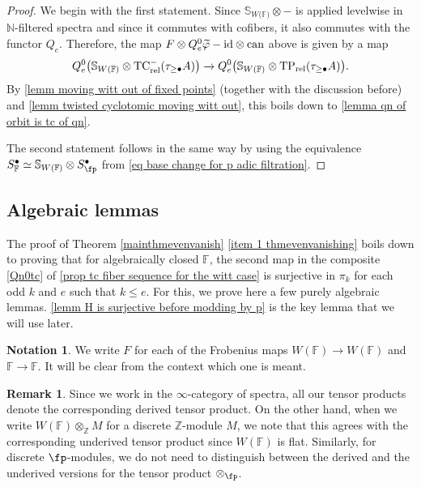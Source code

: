 \documentclass[english,10pt]{amsart}
\newcommand{\sphwf}{\mathbb{S}_{W(\mathbb{F)}}}
\newcommand{\rel}{\textup{rel}}
\newcommand{\field}{\mathbb{F}}
\theoremstyle{definition}
\newtheorem{nota}{Notation}[section]
\newtheorem{rema}{Remark}[section]
\numberwithin{equation}{section}
\newcommand{\rntc}{\mathrm{TC}_{\rel}^{-}}
\newcommand{\rtp}{\mathrm{TP}_{\rel}}
\newcommand{\z}{\mathbb{Z}}
\newcommand{\N}{\mathbb{N}}
\newcommand{\wtw}{\tau_{\geq \bullet}}
\begin{document}
\begin{proof}
We begin with the first statement. Since $\sphwf \otimes -$ is applied levelwise in $\N$-filtered spectra and since it commutes with cofibers, it also commutes with the functor $Q_e$. Therefore, the map $F \otimes Q_e^0\widetilde{\varphi} - \textup{id} \otimes \textup{can}$ above is given by a map
\[Q_e^0\big( \sphwf \otimes \rntc(\wtw A) \big)\xrightarrow{}  Q_e^0 \big(\sphwf\otimes  \rtp(\wtw A)\big).\]
By \autoref{lemm moving witt out of fixed points} (together with the discussion before) and  \autoref{lemm twisted cyclotomic moving witt out}, this boils down to \autoref{lemma qn of orbit is tc of qn}.

The second statement follows in the same way by using the equivalence $S_{\field}^\bullet\simeq \sphwf \otimes S_{\fp}^\bullet$ from \eqref{eq base change for p adic filtration}.
\end{proof}


\subsection{Algebraic lemmas}

The proof of Theorem \ref{mainthmevenvanish} \eqref{item 1 thmevenvanishing} boils down to proving that for algebraically closed $\field$, the second map in the composite \eqref{Qn0tc} of \autoref{prop tc fiber sequence for the witt case} is surjective in $\pi_{k}$ for each odd $k$  and $e$ such that $k \leq e$. For this, we prove here a few purely algebraic lemmas. \autoref{lemm H  is surjective before modding by p} is the key lemma that we will use later.  

\begin{nota}
We write $F$ for each of the Frobenius maps $ W(\field) \to W(\field)$ and $\field \to \field$. It will be clear from the context which one is meant. 
\end{nota}

\begin{rema}
Since we work in the $\infty$-category of spectra, all our tensor products denote the corresponding derived tensor product. On the other hand, when we write $W(\field) \otimes_{\z} M $ for a discrete $\z$-module $M$, we note that this agrees with the corresponding underived tensor product since $W(\field)$ is flat. Similarly, for discrete $\fp$-modules, we do not need to distinguish between the derived and the underived versions for the tensor product $\otimes_{\fp} $. 
\end{rema}
\end{document}
